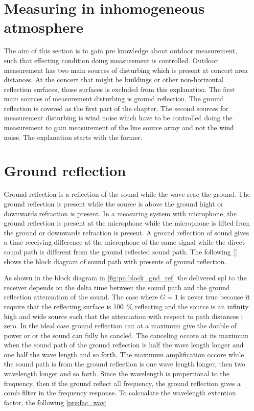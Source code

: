 \section{Measuring in inhomogeneous atmosphere}
The aim of this section is to gain pre knowledge about outdoor measurement, such that effecting condition doing measurement is controlled. Outdoor measurement has two main sources of disturbing which is present at concert area distances. At the concert that might be buildings or other non-horizontal reflection surfaces, those surfaces is excluded from this explanation. The first main sources of measurement disturbing is ground reflection. The ground reflection is covered as the first part of the chapter. The second sources for measurement disturbing is wind noise which have to be controlled doing the measurement to gain measurement of the line source array and not the wind noise. The explanation starts with the former.

\section{Ground reflection}\label{pre:ground_ref}
Ground reflection is a reflection of the sound while the wave reac the ground. The ground reflection is present while the source is above the ground hight or downwards refraction is present. In a measuring system with microphone, the ground reflection is present at the microphone while the microphone is lifted from the ground or downwards refraction is present. A ground reflection of sound gives a time receiving difference at the microphone of the same signal while the direct sound path is different from the ground reflected sound path. The following \autoref{} shows the block diagram of sound path with presents of ground reflection.



As shown in the block diagram in \autoref{fig:pn:block_gnd_ref} the delivered \gls{spl} to the receiver depends on the delta time between the sound path and the ground reflection attenuation of the sound. The case where $G=1$ is never true because it require that the reflecting surface is \SI{100}{\percent} reflecting and the source is an infinity high and wide source such that the attenuation with respect to path distances i zero. In the ideal case ground reflection can at a maximum give the double of power or  or the sound can fully be cancled. The canceling occore at its maximum when the sound path of the ground reflection is half the wave length longer and one half the wave length and so forth. The maximum amplification occore while the sound path is from the ground reflection is one wave length longer, then two wavelength longer and so forth. Since the wavelength is propertional to the frequency, then if the ground reflect all frequency, the ground reflection gives a comb filter in the frequency response. To calcualate the wavelength extention factor, the following \autoref{pre:fac_wav}

